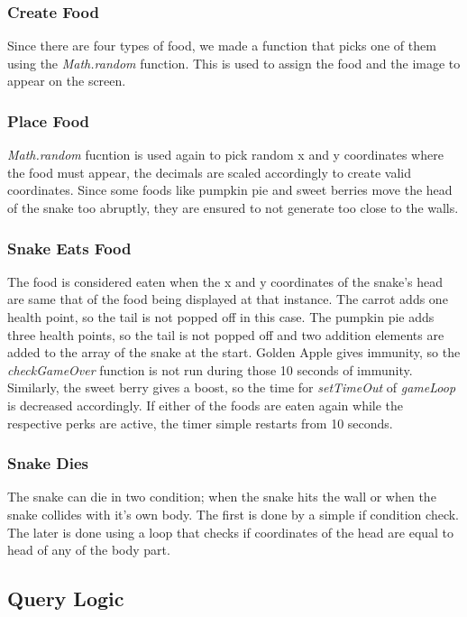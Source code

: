 \documentclass[12pt, letterpaper]{article}
\begin{document}
\subsubsection{Create Food}
Since there are four types of food, we made a function that picks one of them using the \textit{Math.random} function. This is used to assign the food and the image to appear on the screen.

\subsubsection{Place Food}
\textit{Math.random} fucntion is used again to pick random x and y coordinates where the food must appear, the decimals are scaled accordingly to create valid coordinates. Since some foods like pumpkin pie and sweet berries move the head of the snake too abruptly, they are ensured to not generate too close to the walls. 

\subsubsection{Snake Eats Food}
The food is considered eaten when the x and y coordinates of the snake's head are same that of the food being displayed at that instance. The carrot adds one health point, so the tail is not popped off in this case. The pumpkin pie adds three health points, so the tail is not popped off and two addition elements are added to the array of the snake at the start. Golden Apple gives immunity, so the \textit{checkGameOver} function is not run during those 10 seconds of immunity. Similarly, the sweet berry gives a boost, so the time for \textit{setTimeOut} of \textit{gameLoop} is decreased accordingly. If either of the foods are eaten again while the respective perks are active, the timer simple restarts from 10 seconds.

\subsubsection{Snake Dies}
The snake can die in two condition; when the snake hits the wall or when the snake collides with it's own body. The first is done by a simple if condition check. The later is done using a loop that checks if coordinates of the head are equal to head of any of the body part.

\subsection{Query Logic}
\end{document}
